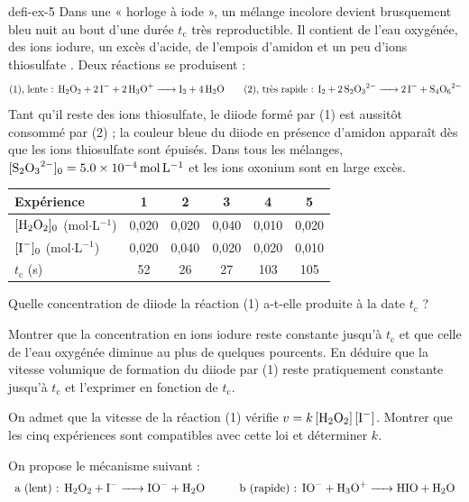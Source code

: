 \begin{blocEdition}{defi-ex-5}
Dans une « horloge à iode », un mélange incolore devient brusquement bleu nuit au bout d'une durée $t_\mathrm{c}$
très reproductible. Il contient de l'eau oxygénée, des ions iodure, un excès d'acide, de l'empois d'amidon et un peu
d'ions thiosulfate . Deux réactions se produisent :
\[\text{(1), lente : }\ce{H2O2 + 2 I- + 2 H3O+ -> I2 + 4 H2O}\qquad\text{(2), très rapide : }\ce{I2 + 2 S2O3^2- -> 2 I- + S4O6^2-}\]
Tant qu'il reste des ions thiosulfate, le diiode formé par (1) est aussitôt consommé par (2) ; la couleur bleue du
diiode en présence d'amidon apparaît dès que les ions thiosulfate sont épuisés. Dans tous les mélanges,
$[\ce{S2O3^2-}]_0=\qty{5,0e-4}{mol.L^{-1}}$ et les ions oxonium sont en large excès.
\begin{center}\small\renewcommand{\arraystretch}{1.2}
\begin{tabular}{@{}l*{5}{c}@{}}\toprule
Expérience & 1 & 2 & 3 & 4 & 5\\\midrule
$[\ce{H2O2}]_0$ (mol$\cdot$L$^{-1}$) & 0,020 & 0,020 & 0,040 & 0,010 & 0,020\\
$[\ce{I-}]_0$ (mol$\cdot$L$^{-1}$) & 0,020 & 0,040 & 0,020 & 0,020 & 0,010\\
$t_\mathrm{c}$ (s) & 52 & 26 & 27 & 103 & 105\\\bottomrule
\end{tabular}\end{center}
\begin{questions}
\item Quelle concentration de diiode la réaction (1) a-t-elle produite à la date $t_\mathrm{c}$ ?
\item Montrer que la concentration en ions iodure reste constante jusqu'à $t_\mathrm{c}$ et que celle de l'eau
oxygénée diminue au plus de quelques pourcents. En déduire que la vitesse volumique de formation du diiode par (1)
reste pratiquement constante jusqu'à $t_\mathrm{c}$ et l'exprimer en fonction de $t_\mathrm{c}$.
\item On admet que la vitesse de la réaction (1) vérifie $v=k\,[\ce{H2O2}]\,[\ce{I-}]$. Montrer que les cinq
expériences sont compatibles avec cette loi et déterminer $k$.
\item On propose le mécanisme suivant :
\[\begin{array}{ll}\text{a (lent) : }\ce{H2O2 + I- -> IO- + H2O}\qquad&\text{b (rapide) : }\ce{IO- + H3O+ -> HIO + H2O}\\[1mm]

\end{array}\]
\end{questions}
\end{blocEdition}
